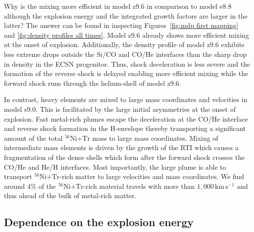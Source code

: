 \documentclass[fleqn,usenatbib]{mnras}
\newcommand{\nickel}{\ensuremath{\mathrm{^{56}Ni}}\xspace}
\newcommand{\tracer}{\ensuremath{\mathrm{Tr}}\xspace}
\newcommand{\kms}{\ensuremath{\mathrm{km\, s^{-1}}}}
\newcommand{\onemg}{\ensuremath{\mathrm{e8.8}}\xspace}
\newcommand{\snine}{\ensuremath{\mathrm{s9.0}}\xspace}
\newcommand{\znine}{\ensuremath{\mathrm{z9.6}}\xspace}
\begin{document}
Why is the mixing more efficient in model \znine in comparison to model \onemg although the explosion energy and the integrated growth factors are larger in the latter? 
The answer can be found in inspecting Figures~\ref{fig:mdp first mapping} and 
\ref{fig:density profiles all times}. 
Model \znine already shows more efficient mixing at the onset of explosion. 
Additionally, the density profile of model \znine exhibits less extreme drops outside the Si/CO and CO/He interfaces than the sharp drop in density in the ECSN progenitor. 
Thus, shock deceleration is less severe and the formation of the reverse shock is 
delayed enabling more efficient mixing while the forward shock runs through the 
helium-shell of model \znine.

In contrast, heavy elements are mixed to large mass coordinates and velocities in model \snine.
This is facilitated by the large initial asymmetries at the onset of explosion.
Fast metal-rich plumes escape the deceleration at the CO/He interface and reverse shock formation in the H-envelope thereby transporting a significant amount of the total $\nickel\mathord{+}\tracer$ mass to large mass coordinates.
Mixing of intermediate mass elements is driven by the growth of the RTI which causes a fragmentation of the dense shells which form after the forward shock crosses the CO/He and He/H interfaces.
Most importantly, the large plume is able to transport $\nickel\mathord{+}\tracer$-rich matter to large velocities and mass coordinates. We find around $4\%$ of the
$\nickel\mathord{+}\tracer$-rich material travels with more than $1,000\,\kms$ and thus ahead of the bulk of metal-rich matter.

\subsection{Dependence on the explosion energy}
\label{sec:Dependence on the explosion energy}
\end{document}
